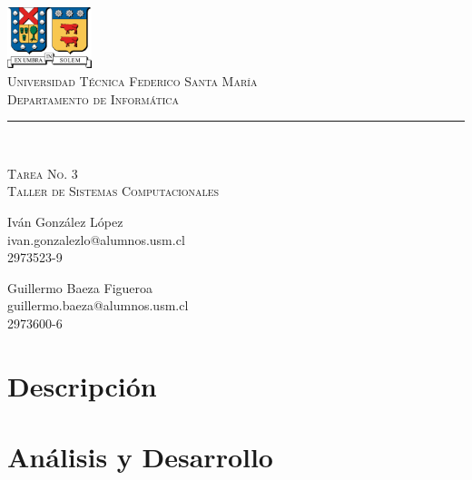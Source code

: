 \documentclass[11pt]{article}
\makeatletter
\newcommand{\labno}{3}
\newcommand{\labtitle}{Taller de Sistemas Computacionales}
\newcommand{\nameone}{Iván González López}
\newcommand{\emailone}{ivan.gonzalezlo@alumnos.usm.cl}
\newcommand{\rolone}{2973523-9}
\newcommand{\nametwo}{Guillermo Baeza Figueroa}
\newcommand{\emailtwo}{guillermo.baeza@alumnos.usm.cl}
\newcommand{\roltwo}{2973600-6}
\makeatother
\begin{document}
\begin{titlepage}
\begin{center}


\includegraphics[width=70pt]{logos/utfsm.pdf} \\
{\Large \textsc{Universidad Técnica Federico Santa María} \\}
{\Large \textsc{Departamento de Informática} \\ \vspace{4pt}}
{\rule[13pt]{\textwidth}{1pt} \\ \vspace{25pt}}
{\LARGE \textsc{Tarea No. \labno} \\}
{\LARGE \textsc{\labtitle} \\ \vspace{50pt}}

\begin{minipage}{0.4\textwidth}
\begin{flushleft}
{\large \nameone} \\
\emailone \\
\rolone
\end{flushleft}
\end{minipage}
\hfill
\begin{minipage}{0.4\textwidth}
\begin{flushright}
{\large \nametwo} \\
\emailtwo \\
\roltwo
\end{flushright}
\end{minipage}
\end{center}
\end{titlepage}


\section{Descripción}

\section{Análisis y Desarrollo}
\end{document}
